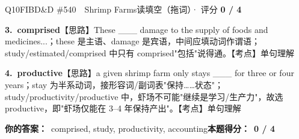 \documentclass[11pt]{article}
\begin{document}
\begin{qblock}{Q10\quad FIBD\&D \#540\ \ Shrimp Farms}{读填空（拖词）· 评分 \textcolor{cAccent}{\bfseries 0 / 4}}
\begin{notebox}
\textbf{3.\ comprised}\quad【思路】These \_\_\_ damage to the supply of foods and medicines...；these 是主语、damage 是宾语，中间应填动词作谓语；study/estimated/comprised 中只有 comprised"包括"说得通。【考点】单句理解\par\smallskip
\textbf{4.\ productive}\quad【思路】a given shrimp farm only stays \_\_\_ for three or four years；stay 为半系动词，接形容词/副词表"保持……状态"；study/productivity/productive 中，虾场不可能"继续是学习/生产力"，故选 productive，即"虾场仅能在 3--4 年保持产出"。【考点】单句理解
\end{notebox}
\smallskip
\textbf{你的答案：}\ {\color{cWrong}comprised, study, productivity, accounting}\qquad\textbf{本题得分：}\ {\color{cAccent}\bfseries 0 / 4}
\end{qblock}
\end{document}
